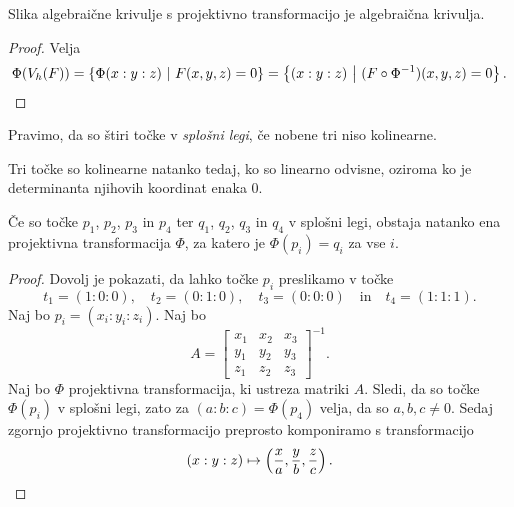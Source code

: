 \begin{trditev}
Slika algebraične krivulje s projektivno transformacijo je
algebraična krivulja.
\end{trditev}

\begin{proof}
Velja
\[
\Phi(V_h(F)) =
\left\{\Phi(x : y : z)~\middle\vert~F(x, y, z) = 0\right\} =
\left\{(x : y : z)~\middle\vert~(F \circ \Phi^{-1})(x, y, z) = 0\right\}. \qedhere
\]
\end{proof}

\begin{definicija}
Pravimo, da so štiri točke v
\emph{splošni legi}, če
nobene tri niso kolinearne.
\end{definicija}

\begin{opomba}
Tri točke so kolinearne natanko tedaj, ko so linearno odvisne,
oziroma ko je determinanta njihovih koordinat enaka $0$.
\end{opomba}

\begin{lema}
Če so točke $p_1$, $p_2$, $p_3$ in $p_4$ ter $q_1$, $q_2$, $q_3$ in
$q_4$ v splošni legi, obstaja natanko ena projektivna
transformacija $\Phi$, za katero je $\Phi(p_i) = q_i$ za vse $i$.
\end{lema}

\begin{proof}
Dovolj je pokazati, da lahko točke $p_i$ preslikamo v točke
\[
t_1 = (1 : 0 : 0), \quad
t_2 = (0 : 1 : 0), \quad
t_3 = (0 : 0 : 0)
\quad \text{in} \quad
t_4 = (1 : 1 : 1).
\]
Naj bo $p_i = (x_i : y_i : z_i)$. Naj bo
\[
A =
\begin{bmatrix}
x_1 & x_2 & x_3 \\
y_1 & y_2 & y_3 \\
z_1 & z_2 & z_3
\end{bmatrix}^{-1}.
\]
Naj bo $\Phi$ projektivna transformacija, ki ustreza matriki $A$.
Sledi, da so točke $\Phi(p_i)$ v splošni legi, zato za
$(a : b : c) = \Phi(p_4)$ velja, da so $a, b, c \ne 0$. Sedaj
zgornjo projektivno transformacijo preprosto komponiramo s
transformacijo
\[
(x : y : z) \mapsto
\left(\frac{x}{a}, \frac{y}{b}, \frac{z}{c}\right). \qedhere
\]
\end{proof}
